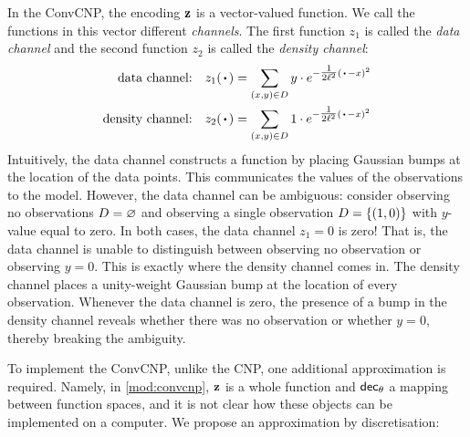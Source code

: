 \documentclass[12pt]{report}
\begin{document}
In the ConvCNP, the encoding $\mathbf{z}$ is a vector-valued function.
We call the functions in this vector different \emph{channels}.
The first function $z_1$ is called the \emph{data channel} and the second function $z_2$ is called the \emph{density channel}:
\begin{align}
    \text{data channel:} &
    \quad z_1(\vardot) =
    \sum_{(x, y) \in D}
    y \cdot e^{-\tfrac1{2\ell^2}(\vardot - x)^2} \label{eq:data_channel} \\
    \text{density channel:} &
    \quad z_2(\vardot) =
    \sum_{(x, y) \in D}
    1 \cdot e^{-\tfrac1{2\ell^2}(\vardot - x)^2} \label{eq:density_channel}
\end{align}
Intuitively, the data channel constructs a function by placing Gaussian bumps at the location of the data points.
This communicates the values of the observations to the model.
However, the data channel can be ambiguous:
consider observing no observations $D = \varnothing$ and observing a single observation $D = \{(1, 0)\}$ with $y$-value equal to zero.
In both cases, the data channel $z_1 = 0$ is zero!
That is, the data channel is unable to distinguish between observing no observation or observing $y=0$.
This is exactly where the density channel comes in.
The density channel places a unity-weight Gaussian bump at the location of every observation.
Whenever the data channel is zero, the presence of a bump in the density channel reveals whether there was no observation or whether $y=0$, thereby breaking the ambiguity.

To implement the ConvCNP, unlike the CNP, one additional approximation is required.
Namely, in \cref{mod:convcnp}, $\mathbf{z}$ is a whole function and $\mathsf{dec}_\theta$ a mapping between function spaces, and it is not clear how these objects can be implemented on a computer.
We propose an approximation by discretisation:
\end{document}
